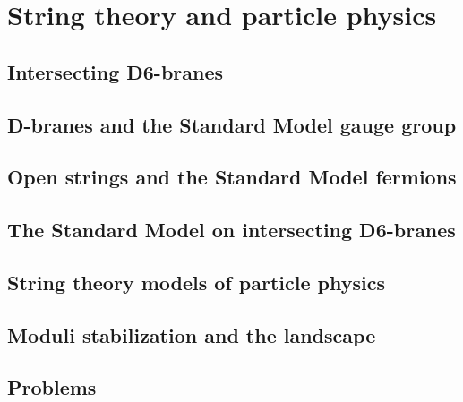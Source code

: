 \documentclass[12pt]{report}
\begin{document}
\chapter{String theory and particle physics}
\newpage
\section{Intersecting D6-branes}
\section{D-branes and the Standard Model gauge group}
\section{Open strings and the Standard Model fermions}
\section{The Standard Model on intersecting D6-branes}
\section{String theory models of particle physics}
\section{Moduli stabilization and the landscape}
\section{Problems}
\end{document}
